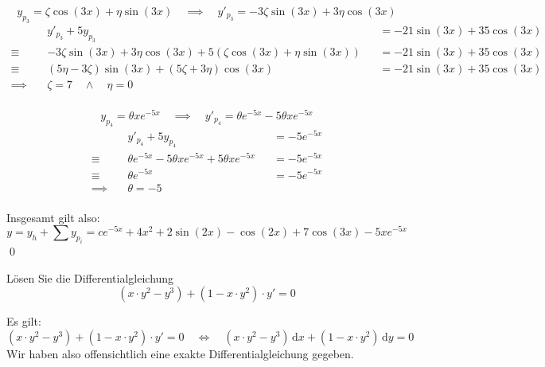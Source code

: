 \documentclass[answers]{exam}
\renewcommand{\d}{\,\mathrm{d}}
\begin{document}
\begin{questions}
\begin{solution}
        $$
            \boxed{
            y_{p_3} = \zeta \cos(3x) + \eta \sin(3x) \quad \implies \quad y'_{p_3} = -3\zeta \sin(3x) + 3\eta \cos(3x)
            }
        $$
        $$
            \begin{aligned}
                               & y'_{p_3} + 5y_{p_3}                                                               &  & = - 21\sin(3x) + 35\cos(3x) \\
                \equiv \quad   & -3\zeta \sin(3x) + 3\eta \cos(3x) + 5 \left(\zeta \cos(3x) + \eta \sin(3x)\right) &  & = - 21\sin(3x) + 35\cos(3x) \\
                \equiv \quad   & (5\eta - 3\zeta) \sin(3x) + (5 \zeta + 3\eta) \cos(3x)                            &  & = - 21\sin(3x) + 35\cos(3x) \\
                \implies \quad & \zeta = 7 \quad \land \quad \eta = 0                                                                               \\
            \end{aligned}
        $$

        $$
            \boxed{
            y_{p_4} = \theta xe^{-5x} \quad \implies \quad y'_{p_4} = \theta e^{-5x} -5\theta xe^{-5x}
            }
        $$
        $$
            \begin{aligned}
                               & y'_{p_4} + 5y_{p_4}                                &  & = - 5e^{-5x} \\
                \equiv \quad   & \theta e^{-5x} -5\theta xe^{-5x} +5\theta xe^{-5x} &  & = - 5e^{-5x} \\
                \equiv \quad   & \theta e^{-5x}                                     &  & = - 5e^{-5x} \\
                \implies \quad & \theta = -5                                                          \\
            \end{aligned}
        $$

        Insgesamt gilt also:
        $$
            y = y_h + \sum y_{p_i} = ce^{-5x} + 4x^2 + 2\sin(2x) - \cos(2x) + 7\cos(3x) - 5xe^{-5x}
        $$\qed
    \end{solution}

    \newpage
    \question
    Lösen Sie die Differentialgleichung
    $$
        (x \cdot y^2 - y^3) + (1-x \cdot y^2) \cdot y' = 0
    $$
    \begin{solution}
        Es gilt:
        $$
            (x \cdot y^2 - y^3) + (1-x \cdot y^2) \cdot y' = 0 \quad \iff \quad (x \cdot y^2 - y^3) \d x + (1-x \cdot y^2) \d y = 0
        $$
        Wir haben also offensichtlich eine exakte Differentialgleichung gegeben.


\end{solution}
\end{questions}
\end{document}
